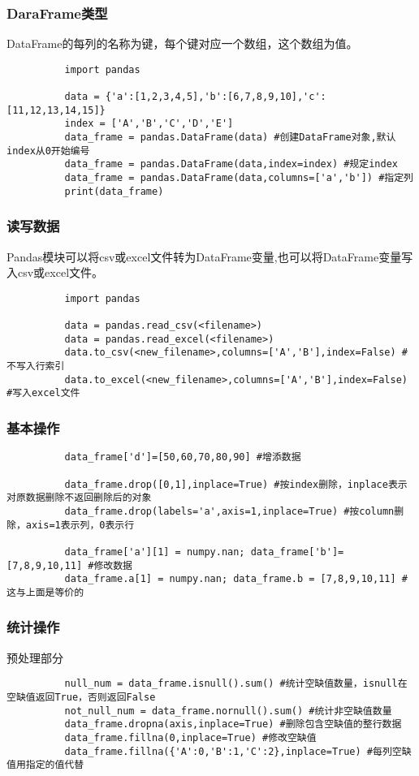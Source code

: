 \documentclass{article}
\begin{document}
      \subsubsection{DaraFrame类型}
        DataFrame的每列的名称为键，每个键对应一个数组，这个数组为值。
        \begin{lstlisting}
          import pandas

          data = {'a':[1,2,3,4,5],'b':[6,7,8,9,10],'c':[11,12,13,14,15]}
          index = ['A','B','C','D','E']
          data_frame = pandas.DataFrame(data) #创建DataFrame对象,默认index从0开始编号
          data_frame = pandas.DataFrame(data,index=index) #规定index
          data_frame = pandas.DataFrame(data,columns=['a','b']) #指定列
          print(data_frame)
        \end{lstlisting}

      \subsubsection{读写数据}
        Pandas模块可以将csv或excel文件转为DataFrame变量,也可以将DataFrame变量写入csv或excel文件。
        \begin{lstlisting}
          import pandas

          data = pandas.read_csv(<filename>)
          data = pandas.read_excel(<filename>)
          data.to_csv(<new_filename>,columns=['A','B'],index=False) #不写入行索引
          data.to_excel(<new_filename>,columns=['A','B'],index=False) #写入excel文件
        \end{lstlisting}

      \subsubsection{基本操作}
        \begin{lstlisting}
          data_frame['d']=[50,60,70,80,90] #增添数据

          data_frame.drop([0,1],inplace=True) #按index删除，inplace表示对原数据删除不返回删除后的对象
          data_frame.drop(labels='a',axis=1,inplace=True) #按column删除，axis=1表示列，0表示行

          data_frame['a'][1] = numpy.nan; data_frame['b']=[7,8,9,10,11] #修改数据
          data_frame.a[1] = numpy.nan; data_frame.b = [7,8,9,10,11] #这与上面是等价的
        \end{lstlisting}

      \subsubsection{统计操作}
        预处理部分
        \begin{lstlisting}
          null_num = data_frame.isnull().sum() #统计空缺值数量，isnull在空缺值返回True，否则返回False
          not_null_num = data_frame.nornull().sum() #统计非空缺值数量
          data_frame.dropna(axis,inplace=True) #删除包含空缺值的整行数据
          data_frame.fillna(0,inplace=True) #修改空缺值
          data_frame.fillna({'A':0,'B':1,'C':2},inplace=True) #每列空缺值用指定的值代替
        \end{lstlisting}
\end{document}
